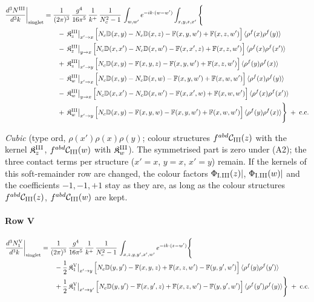 \documentclass[10pt]{article}
\def\mf#1{\mathbb{#1}}
\begin{document}
\begin{align}
\frac{d^{3}N^{\rm III}}{d^{3}k}\bigg|_{\rm singlet}&=\frac{1}{(2\pi)^{3}}\,\frac{g^{4}}{16\pi^{5}}\,\frac{1}{k^{+}}\,\frac{1}{N_{c}^{2}-1}\,\int_{w,w'}e^{-ik\cdot(w-w')}\int_{x,y,z,x'}\Bigg\{\notag\\
&\qquad -\,\mathfrak{K}^{\rm III}_{z}\big|_{x'\to x}\,\Big[N_{c}\mf{D}(x,y)-N_{c}\mf{D}(x,z)-\mf{F}(x,y,w')+\mf{F}(x,z,w')\Big]\,\langle\rho^{f}(x)\rho^{f}(y)\rangle\notag\\
&\qquad -\,\mathfrak{K}^{\rm III}_{z}\big|_{y\to x}\,\Big[N_{c}\mf{D}(x,x')-N_{c}\mf{D}(x,w')-\mf{F}(x,x',z)+\mf{F}(x,z,w')\Big]\,\langle\rho^{f}(x)\rho^{f}(x')\rangle\notag\\
&\qquad +\,\mathfrak{K}^{\rm III}_{z}\big|_{x'\to y}\,\Big[N_{c}\mf{D}(x,y)-\mf{F}(x,y,z)-\mf{F}(x,y,w')+\mf{F}(x,z,w')\Big]\,\langle\rho^{f}(y)\rho^{f}(x)\rangle\notag\\
&\qquad -\,\mathfrak{K}^{\rm III}_{w}\big|_{x'\to x}\,\Big[N_{c}\mf{D}(x,y)-N_{c}\mf{D}(x,w)-\mf{F}(x,y,w')+\mf{F}(x,w,w')\Big]\,\langle\rho^{f}(x)\rho^{f}(y)\rangle\notag\\
&\qquad -\,\mathfrak{K}^{\rm III}_{w}\big|_{y\to x}\,\Big[N_{c}\mf{D}(x,x')-N_{c}\mf{D}(x,w')-\mf{F}(x,x',w)+\mf{F}(x,w,w')\Big]\,\langle\rho^{f}(x)\rho^{f}(x')\rangle\notag\\
&\qquad +\,\mathfrak{K}^{\rm III}_{w}\big|_{x'\to y}\,\Big[N_{c}\mf{D}(x,y)-\mf{F}(x,y,w)-\mf{F}(x,y,w')+\mf{F}(x,w,w')\Big]\,\langle\rho^{f}(y)\rho^{f}(x)\rangle\Bigg\}\;+\;{\rm c.c.}\label{eq:s-I-III}
\end{align}

\emph{Cubic} (type ord, $\rho(x')\rho(x)\rho(y)$; colour structures $f^{abd}\mathcal{C}_{\rm III}(z)$ with the kernel $\mathfrak{K}^{\rm III}_{z}$, $f^{abd}\mathcal{C}_{\rm III}(w)$ with $\mathfrak{K}^{\rm III}_{w}$). The symmetrised part is zero under (A2); the three contact terms per structure ($x'=x$, $y=x$, $x'=y$) remain. If the kernels of this soft-remainder row are changed, the colour factors $\Phi_{\rm I.III}(z)|$, $\Phi_{\rm I.III}(w)|$ and the coefficients $-1,-1,+1$ stay as they are, as long as the colour structures $f^{abd}\mathcal{C}_{\rm III}(z)$, $f^{abd}\mathcal{C}_{\rm III}(w)$ are kept.

\paragraph*{Row V}

\begin{align}
\frac{d^{3}N_{1}^{\rm V}}{d^{3}k}\bigg|_{\rm singlet}&=\frac{1}{(2\pi)^{3}}\,\frac{g^{4}}{16\pi^{5}}\,\frac{1}{k^{+}}\,\frac{1}{N_{c}^{2}-1}\,\int_{x,z,y,y',x',w'}e^{-ik\cdot(z-w')}\Bigg\{\notag\\
&\qquad -\frac{1}{2}\,\mathfrak{K}^{\rm V}_{1}\big|_{x'\to y}\,\Big[N_{c}\mf{D}(y,y')-\mf{F}(x,y,z)+\mf{F}(x,z,w')-\mf{F}(y,y',w')\Big]\,\langle\rho^{f}(y)\rho^{f}(y')\rangle\notag\\
&\qquad +\frac{1}{2}\,\mathfrak{K}^{\rm V}_{1}\big|_{x'\to y'}\,\Big[N_{c}\mf{D}(y,y')-\mf{F}(x,y',z)+\mf{F}(x,z,w')-\mf{F}(y,y',w')\Big]\,\langle\rho^{f}(y')\rho^{f}(y)\rangle\Bigg\}\;+\;{\rm c.c.}\label{eq:s-I-V-1}
\end{align}
\end{document}
